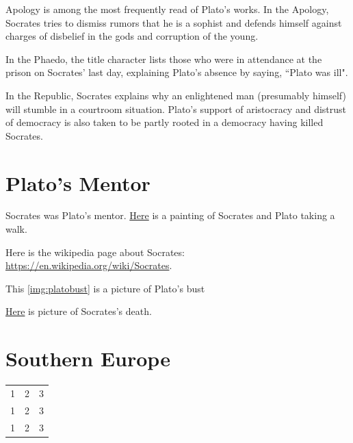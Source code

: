 \documentclass[11pt]{article}
\begin{document}
		\begin{description}[align=left]
			\item[Apology] Apology is among the most frequently read of Plato's works. In the Apology, Socrates tries to dismiss rumors that he is a sophist and defends himself against charges of disbelief in the gods and corruption of the young.
			\item[Phaedo] In the Phaedo, the title character lists those who were in attendance at the prison on Socrates' last day, explaining Plato's absence by saying, ``Plato was ill".
			\item[Republic] In the Republic, Socrates explains why an enlightened man (presumably himself) will stumble in a courtroom situation. Plato's support of aristocracy and distrust of democracy is also taken to be partly rooted in a democracy having killed Socrates.
		\end{description}

	\section{Plato's Mentor}
		Socrates was Plato's mentor. \href{https://classicalwisdom.com/wp-content/uploads/2012/12/plato-socrates.jpg}{Here} is a painting of Socrates and Plato taking a walk.

		Here is the wikipedia page about Socrates: \url{https://en.wikipedia.org/wiki/Socrates}.

		This \ref{img:platobust} is a picture of Plato's bust

		\href{run:./images/death_of_socrates.jpg}{Here} is picture of Socrates's death.

	\section{Southern Europe}
		\begin{tabular}{c c c}
			\hline
			1 & 2 & 3 \\
			1 & 2 & 3 \\
			1 & 2 & 3
			\hline
		\end{tabular}
\end{document}

